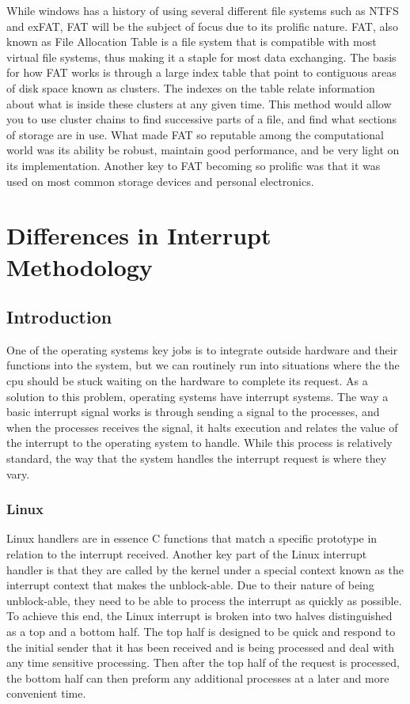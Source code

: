 \documentclass[draftclsnofoot, onecolumn] {report}
\begin{document}
While windows has a history of using several different file systems such as NTFS and exFAT, FAT will be the subject of focus due to its prolific nature. 
FAT, also known as File Allocation Table is a file system that is compatible with most virtual file systems, thus making it a staple for most data exchanging. 
The basis for how FAT works is through a large index table that point to contiguous areas of disk space known as clusters.
The indexes on the table relate information about what is inside these clusters at any given time.
This method would allow you to use cluster chains to find successive parts of a file, and find what sections of storage are in use. 
What made FAT so reputable among the computational world was its ability be robust, maintain good performance, and be very light on its implementation.
Another key to FAT becoming so prolific was that it was used on most common storage devices and personal electronics.   

\chapter{Differences in Interrupt Methodology}

\section{Introduction}
One of the operating systems key jobs is to integrate outside hardware and their functions into the system, but we can routinely run into situations where the the cpu should be stuck waiting on the hardware to complete its request. 
As a solution to this problem, operating systems have interrupt systems.
The way a basic interrupt signal works is through sending a signal to the processes, and when the processes receives the signal, it halts execution and relates the value of the interrupt to the operating system to handle. 
While this process is relatively standard, the way that the system handles the interrupt request is where they vary. 

\subsection{Linux}
Linux handlers are in essence C functions that match a specific prototype in relation to the interrupt received.
Another key part of the Linux interrupt handler is that they are called by the kernel under a special context known as the interrupt context that makes the unblock-able.
Due to their nature of being unblock-able, they need to be able to process the interrupt as quickly as possible.
To achieve this end, the Linux interrupt is broken into two halves distinguished as a top and a bottom half. 
The top half is designed to be quick  and respond to the initial sender that it has been received and is being processed and deal with any time sensitive processing. 
Then after the top half of the request is processed, the bottom half can then preform any additional processes at a later and more convenient time.
\end{document}
